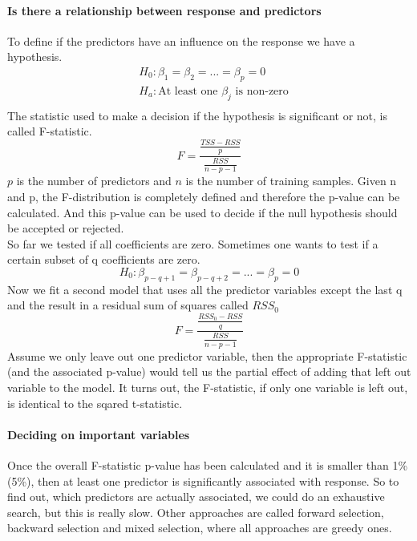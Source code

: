 \documentclass[../document.tex]{subfiles}
\begin{document}
	\paragraph{Is there a relationship between response and predictors}
	To define if the predictors have an influence on the response we have a hypothesis.
	\begin{equation}
	\begin{split}
		&H_{0}:\beta_{1}=\beta_{2}=...=\beta_{p}=0\\
		&H_{a}:\text{At least one }\beta_{j}\text{ is non-zero}\\
	\end{split}
	\end{equation}
	The statistic used to make a decision if the hypothesis is significant or not, is called F-statistic.
	\begin{equation}
		F = \frac{\frac{TSS-RSS}{p}}{\frac{RSS}{n-p-1}}
	\end{equation}
	\(p\) is the number of predictors and \(n\) is the number of training samples.
	Given n and p, the F-distribution is completely defined and therefore the p-value can be calculated. And this p-value can be used to decide if the null hypothesis should be accepted or rejected.\\
	So far we tested if all coefficients are zero. Sometimes one wants to test if a certain subset of q coefficients are zero.
	\begin{equation}
		H_{0}: \beta_{p-q+1}=\beta_{p-q+2}=...=\beta_{p}=0
	\end{equation}
	Now we fit a second model that uses all the predictor variables except the last q and the result in a residual sum of squares called \(RSS_{0}\)
	\begin{equation}
		F = \frac{\frac{RSS_{0}-RSS}{q}}{\frac{RSS}{n-p-1}}
	\end{equation}
	Assume we only leave out one predictor variable, then the appropriate F-statistic (and the associated p-value) would tell us the partial effect of adding that left out variable to the model. It turns out, the F-statistic, if only one variable is left out, is identical to the sqared t-statistic.
	\paragraph{Deciding on important variables}
	Once the overall F-statistic p-value has been calculated and it is smaller than 1\% (5\%), then at least one predictor is significantly associated with response. So to find out, which predictors are actually associated, we could do an exhaustive search, but this is really slow. Other approaches are called forward selection, backward selection and mixed selection, where all approaches are greedy ones.
\end{document}

